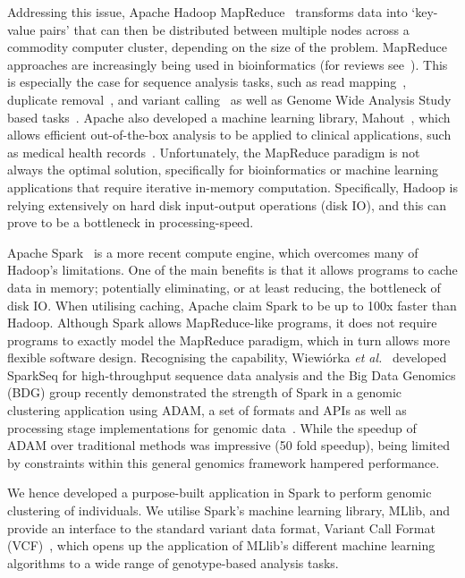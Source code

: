 \documentclass{bmcart}
\begin{document}
Addressing this issue, {\sc Apache Hadoop MapReduce}~\cite{Borthakur2007} transforms data into `key-value pairs' that can then be distributed between multiple nodes across a commodity computer cluster, depending on the size of the problem. 
MapReduce approaches are increasingly being used in bioinformatics (for reviews see~\cite{Zou2013, Qiu2010,Taylor2010}). 
This is especially the case for sequence analysis tasks, such as read mapping~\cite{Schatz2009}, duplicate removal~\cite{Jourdren2012}, and variant calling~\cite{Langmead2009, McKenna2010} as well as Genome Wide Analysis Study based tasks~\cite{Huang2013, Guo2014}. 
Apache also developed a machine learning library, Mahout~\cite{Owen2011}, which allows efficient out-of-the-box analysis to be applied to clinical applications, such as medical health records~\cite{Ko2014}.
Unfortunately, the MapReduce paradigm is not always the optimal solution, specifically for bioinformatics or machine learning applications that require iterative in-memory computation. Specifically, Hadoop is relying extensively on hard disk input-output operations (disk IO), and this can prove to be a bottleneck in processing-speed.

{\sc Apache Spark}~\cite{Zaharia2011} is a more recent compute engine, which overcomes many of Hadoop's limitations. 
One of the main benefits is that it allows programs to cache data in memory; potentially eliminating, or at least reducing, the bottleneck of disk IO. 
When utilising caching, Apache claim {\sc Spark} to be up to 100x faster than Hadoop. 
Although {\sc Spark} allows MapReduce-like programs, it does not require programs to exactly model the MapReduce paradigm, which in turn allows more flexible software design. 
Recognising the capability, Wiewi{\'o}rka {\it et al.}~\cite{Wiewiorka2014} developed {\sc SparkSeq} for high-throughput sequence data analysis and the Big Data Genomics (BDG) group recently demonstrated the strength of {\sc Spark} in a genomic clustering application using {\sc ADAM}, a set of formats and APIs as well as processing stage implementations for genomic data~\cite{Massie2013}. 
While the speedup of {\sc ADAM} over traditional methods was impressive (50 fold speedup), being limited by constraints within this general genomics framework hampered performance. 

We hence developed a purpose-built application in {\sc Spark} to perform genomic clustering of individuals. 
We utilise {\sc Spark}'s machine learning library, \mbox{MLlib}, and provide an interface to the standard variant data format, Variant Call Format (VCF)~\cite{1KG2012}, which opens up the application of MLlib's different machine learning algorithms to a wide range of genotype-based analysis tasks. 
\end{document}
